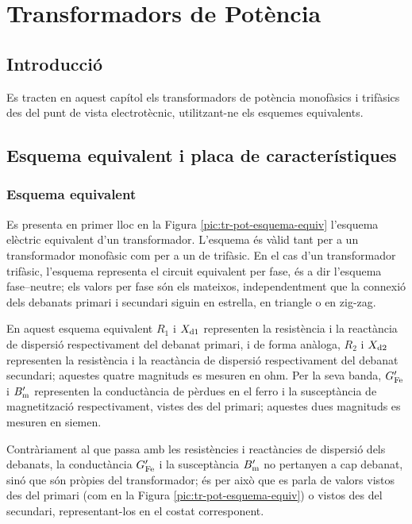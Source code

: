 \chapter{Transformadors de Potència}

\section{Introducció}
Es tracten en aquest capítol els transformadors de potència
monofàsics i trifàsics des del punt de vista electrotècnic, utilitzant-ne els esquemes equivalents.

\section{Esquema equivalent i placa de característiques}

\subsection{Esquema equivalent}

Es presenta en primer lloc en la Figura \vref{pic:tr-pot-esquema-equiv} l'esquema elèctric equivalent d'un transformador.
L'esquema és vàlid tant per a un transformador monofàsic com per a un de trifàsic. En el cas d'un transformador trifàsic, l'esquema representa el circuit equivalent per fase, és a dir l'esquema fase--neutre; els valors per fase són els mateixos, independentment que la connexió dels debanats primari i secundari siguin en estrella, en triangle o en zig-zag.

\begin{center}
    
    \label{pic:tr-pot-esquema-equiv}
\end{center}

En aquest esquema equivalent $R_1$ i $X_\mathrm{d1}$ representen la resistència i la reactància de dispersió respectivament del debanat primari, i de forma anàloga, $R_2$ i $X_\mathrm{d2}$ representen la resistència i la reactància de dispersió respectivament del debanat secundari; aquestes quatre magnituds es mesuren en ohm. Per la seva banda, $G_\mathrm{Fe}'$ i $B_\mathrm{m}'$ representen la conductància de pèrdues en el ferro i la susceptància de magnetització respectivament, vistes des del primari; aquestes dues magnituds es mesuren en siemen.

Contràriament al que passa amb les resistències i reactàncies de dispersió dels debanats, la conductància $G_\mathrm{Fe}'$ i la susceptància $B_\mathrm{m}'$ no pertanyen a cap debanat, sinó que són pròpies del transformador; és per això que es parla de valors vistos des del primari (com en la Figura \vref{pic:tr-pot-esquema-equiv}) o vistos des del secundari, representant-los en el costat corresponent.

